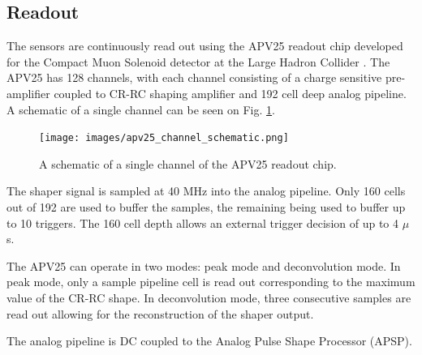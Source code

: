 \subsection{Readout}

The sensors are continuously read out using the APV25 readout chip developed for
the Compact Muon Solenoid detector at the Large Hadron Collider 
\cite{apvdesign}. The APV25 has 128 channels, with each channel consisting
of a charge sensitive pre-amplifier coupled to CR-RC shaping amplifier and 192
cell deep analog pipeline.  A schematic of a single channel can be seen on 
Fig. \ref{fig:apv25_schem}.
\begin{figure}
    \centering
    \texttt{[image: images/apv25\_channel\_schematic.png]}
    \caption{A schematic of a single channel of the APV25 readout chip.}
    \label{fig:apv25_schem}
\end{figure}

The shaper signal is sampled at 40 MHz into the analog pipeline.  Only 160 cells
out of 192 are used to buffer the samples, the remaining being used to buffer
up to 10 triggers.  The 160 cell depth allows an external trigger decision of 
up to 4 $\mu$s.    

The APV25 can operate in two modes: peak mode and deconvolution mode.  In peak
mode, only a sample pipeline cell is read out corresponding to the maximum 
value of the CR-RC shape.  In deconvolution mode, three consecutive samples are
read out allowing for the reconstruction of the shaper output.

The analog pipeline is DC coupled to the Analog Pulse Shape Processor (APSP).

